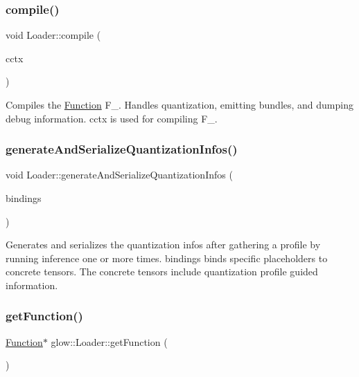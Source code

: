 \subsubsection{\texorpdfstring{compile()}{compile()}\hspace{0.1cm}{\footnotesize\ttfamily [2/2]}}
{\footnotesize\ttfamily void Loader\+::compile (\begin{DoxyParamCaption}\item[{\hyperlink{structglow_1_1_compilation_context}{Compilation\+Context} \&}]{cctx }\end{DoxyParamCaption})}

Compiles the \hyperlink{classglow_1_1_function}{Function} F\+\_\+. Handles quantization, emitting bundles, and dumping debug information. {\ttfamily cctx} is used for compiling F\+\_\+. \mbox{\label{classglow_1_1_loader_a4f1ea05794900ee3b6228f4d32229cfb}} 
\subsubsection{\texorpdfstring{generate\+And\+Serialize\+Quantization\+Infos()}{generateAndSerializeQuantizationInfos()}}
{\footnotesize\ttfamily void Loader\+::generate\+And\+Serialize\+Quantization\+Infos (\begin{DoxyParamCaption}\item[{\hyperlink{classglow_1_1_placeholder_bindings}{Placeholder\+Bindings} \&}]{bindings }\end{DoxyParamCaption})}

Generates and serializes the quantization infos after gathering a profile by running inference one or more times. {\ttfamily bindings} binds specific placeholders to concrete tensors. The concrete tensors include quantization profile guided information. \mbox{\label{classglow_1_1_loader_aab4ded493e718300df251a1841523c3d}} 
\subsubsection{\texorpdfstring{get\+Function()}{getFunction()}}
{\footnotesize\ttfamily \hyperlink{classglow_1_1_function}{Function}$\ast$ glow\+::\+Loader\+::get\+Function (\begin{DoxyParamCaption}{ }\end{DoxyParamCaption})\hspace{0.3cm}{\ttfamily [inline]}}

